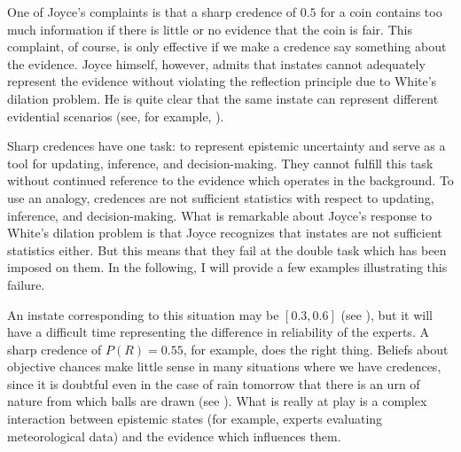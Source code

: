 \documentclass[11pt]{article}
\begin{document}
One of Joyce's complaints is that a sharp credence of $0.5$ for a coin
contains too much information if there is little or no evidence that
the coin is fair. This complaint, of course, is only effective if we
make a credence say something about the evidence. Joyce himself,
however, admits that instates cannot adequately represent the evidence
without violating the reflection principle due to White's dilation
problem. He is quite clear that the same instate can represent
different evidential scenarios (see, for example,
).

Sharp credences have one task: to represent epistemic uncertainty and
serve as a tool for updating, inference, and decision-making. They
cannot fulfill this task without continued reference to the evidence
which operates in the background. To use an analogy, credences are not
sufficient statistics with respect to updating, inference, and
decision-making. What is remarkable about Joyce's response to White's
dilation problem is that Joyce recognizes that instates are not
sufficient statistics either. But this means that they fail at the
double task which has been imposed on them. In the following, I will
provide a few examples illustrating this failure.


An instate corresponding to this situation may be $[0.3,0.6]$ (see
), but it will have a difficult time
representing the difference in reliability of the experts. A sharp
credence of $P(R)=0.55$, for example, does the right thing. Beliefs
about objective chances make little sense in many situations where we
have credences, since it is doubtful even in the case of rain tomorrow
that there is an urn of nature from which balls are drawn (see
). What is really at play is a complex
interaction between epistemic states (for example, experts evaluating
meteorological data) and the evidence which influences them.

\end{document}
